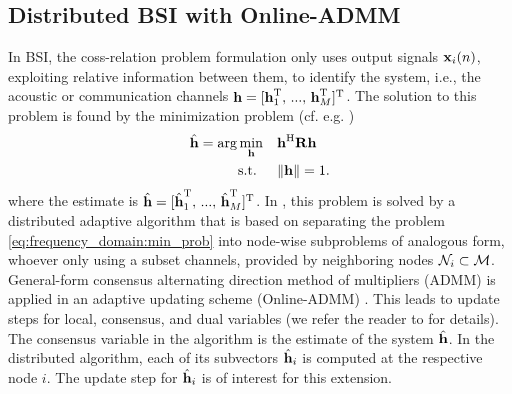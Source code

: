 \documentclass{article}
\begin{document}
\subsection[]{Distributed BSI with Online-ADMM}
In BSI, the coss-relation problem formulation only uses output signals \(\bm{\mathrm{x}}_i(n)\), exploiting relative information between them, to identify the system, i.e., the acoustic or communication channels \(\bm{\mathrm{h}} = [\bm{\mathrm{h}}_1^{\mathrm{T}},\,...,\,\bm{\mathrm{h}}_M^{\mathrm{T}}]^{\mathrm{T}}\).
The solution to this problem is found by the minimization problem (cf. e.g. \cite{langtongBlindIdentificationEqualization1994,huangAdaptiveMultichannelLeast2002,huangClassFrequencydomainAdaptive2003,blochbergerDBSI})
\begin{equation}
    \begin{aligned}
        \hat{\bm{\mathrm{h}}} = \arg \min_{\bm{\mathrm{h}}} \quad &\bm{\mathrm{h}}^{\mathrm{H}} \bm{\mathrm{R}} \bm{\mathrm{h}} \\
        \text{s.t. } \quad &\|\bm{\mathrm{h}}\| = 1.
    \end{aligned}\label{eq:frequency_domain:min_prob}
\end{equation}
where the estimate is \(\hat{\bm{\mathrm{h}}} = [\hat{\bm{\mathrm{h}}}_1^{\mathrm{T}},\,...,\,\hat{\bm{\mathrm{h}}}_M^{\mathrm{T}}]^{\mathrm{T}}\).
In \cite{blochbergerDBSI}, this problem is solved by a distributed adaptive algorithm that is based on separating the problem \eqref{eq:frequency_domain:min_prob} into node-wise subproblems of analogous form, whoever only using a subset channels, provided by neighboring nodes \(\mathcal{N}_i \subset \mathcal{M}\).
General-form consensus alternating direction method of multipliers (ADMM) \cite{boydDistributedOptimizationStatistical2011} is applied in an adaptive updating scheme (Online-ADMM) \cite{wangOnlineAlternatingDirection2013,hosseiniOnlineDistributedADMM2014}.
This leads to update steps for local, consensus, and dual variables (we refer the reader to \cite{blochbergerDBSI} for details).
The consensus variable in the algorithm is the estimate of the system \(\hat{\bm{\mathrm{h}}}\).
In the distributed algorithm, each of its subvectors \(\hat{\bm{\mathrm{h}}}_i\) is computed at the respective node \(i\).
The update step for \(\hat{\bm{\mathrm{h}}}_i\) is of interest for this extension.
\end{document}
